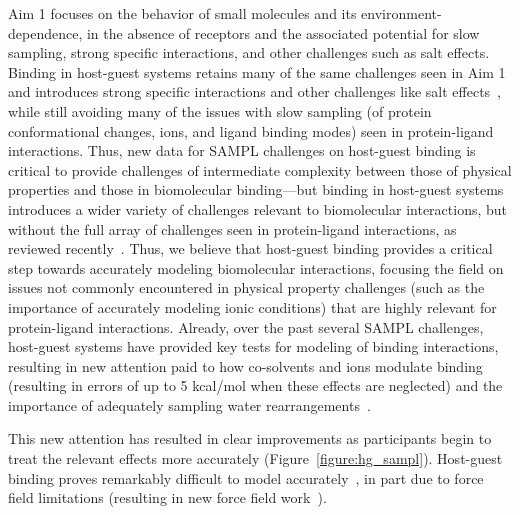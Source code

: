 \documentclass[11pt]{article}
\begin{document}
Aim 1 focuses on the behavior of small molecules and its environment-dependence, in the absence of receptors and the associated potential for slow sampling, strong specific interactions, and other challenges such as salt effects.
Binding in host-guest systems retains many of the same challenges seen in Aim 1 and introduces strong specific interactions and other challenges like salt effects~\cite{mobley_predicting_2016}, while still avoiding many of the issues with slow sampling (of protein conformational changes, ions, and ligand binding modes) seen in protein-ligand interactions.
Thus, new data for SAMPL challenges on host-guest binding is critical to provide challenges of intermediate complexity between those of physical properties and those in biomolecular binding---but binding in host-guest systems introduces a wider variety of challenges relevant to biomolecular interactions, but without the full array of challenges seen in protein-ligand interactions, as reviewed recently~\cite{mobley_predicting_2016}.
Thus, we believe that host-guest binding provides a critical step towards accurately modeling biomolecular interactions, focusing the field on issues not commonly encountered in physical property challenges (such as the importance of accurately modeling ionic conditions) that are highly relevant for protein-ligand interactions.
Already, over the past several SAMPL challenges, host-guest systems have provided key tests for modeling of binding interactions, resulting in new attention paid to how co-solvents and ions modulate binding (resulting in errors of up to 5 kcal/mol when these effects are neglected) and the importance of adequately sampling water rearrangements~\cite{muddana_sampl4_2014, mobley_predicting_2016, yin_overview_2016, bhakat_resolving_2016}. 

This new attention has resulted in clear improvements as participants begin to treat the relevant effects more accurately (Figure~\ref{figure:hg_sampl}).
Host-guest binding proves remarkably difficult to model accurately~\cite{henriksen_computational_2015}, in part due to force field limitations (resulting in new force field work~\cite{yin_toward_2015}).
\end{document}
